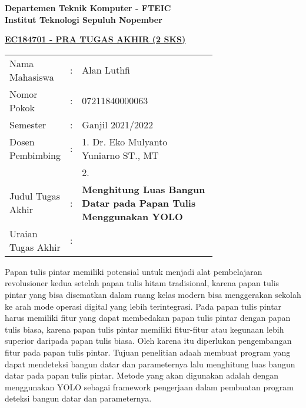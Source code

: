 \begin{flushleft}
    \textbf{Departemen Teknik Komputer - FTEIC}\\
    \textbf{Institut Teknologi Sepuluh Nopember}\\
  \end{flushleft}
  
  \begin{center}
    \underline{\textbf{EC184701 - PRA TUGAS AKHIR (2 SKS)}}
  \end{center}
  
  \begin{adjustwidth}{-0.2cm}{}
    \begin{tabular}{lcp{0.7\linewidth}}
  
      Nama Mahasiswa &:& Alan Luthfi \\
      Nomor Pokok &:& 07211840000063 \\
  
      Semester &:& Ganjil 2021/2022 \\
  
      Dosen Pembimbing &:& 1. Dr. Eko Mulyanto Yuniarno ST., MT \\
      & & 2. \\
  
      Judul Tugas Akhir &:& \textbf{Menghitung Luas Bangun Datar pada Papan Tulis Menggunakan YOLO} \\
  
      Uraian Tugas Akhir &:& \\
    \end{tabular}
  \end{adjustwidth}
  
  Papan tulis pintar memiliki potensial untuk menjadi alat pembelajaran revolusioner kedua setelah papan tulis hitam tradisional, karena papan tulis pintar yang bisa disematkan dalam ruang kelas modern bisa menggerakan sekolah ke arah mode operasi digital yang lebih terintegrasi. Pada papan tulis pintar harus memiliki fitur yang dapat membedakan papan tulis pintar dengan papan tulis biasa, karena papan tulis pintar memiliki fitur-fitur atau kegunaan lebih superior daripada papan tulis biasa. Oleh karena itu diperlukan pengembangan fitur pada papan tulis pintar. Tujuan penelitian adaah membuat program yang dapat mendeteksi bangun datar dan parameternya lalu menghitung luas bangun datar pada papan tulis pintar. Metode yang akan digunakan adalah dengan menggunakan YOLO sebagai framework pengerjaan dalam pembuatan program deteksi bangun datar dan parameternya.
  \vspace{1ex}
  
